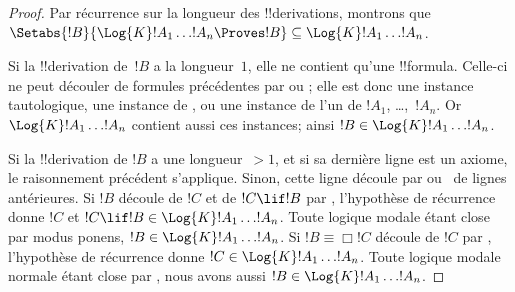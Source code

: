 \documentclass[../../../include/open-logic-section]{subfiles}
\begin{document}
\begin{proof}
  Par récurrence sur la longueur des !!{derivation}s, montrons que
  $\Setabs{!B}{\Log{K} !A_1 \dots !A_n \Proves !B} \subseteq
  \Log{K} !A_1 \dots !A_n$.

  Si la !!{derivation} de~$!B$ a la longueur~$1$, elle ne contient
  qu'une !!{formula}. Celle-ci ne peut découler de formules
  précédentes par \MP{} ou \Nec; elle est donc une instance
  tautologique, une instance de ,
  ou une instance de l'un de $!A_1$, \dots,~$!A_n$. Or
  $\Log{K}!A_1\dots!A_n$ contient aussi ces instances; ainsi
  $!B \in \Log{K}!A_1 \dots !A_n$.

  Si la !!{derivation} de $!B$ a une longueur~$> 1$, et si sa
  dernière ligne est un axiome, le raisonnement précédent s'applique.
  Sinon, cette ligne découle par \MP{} ou~\Nec{} de lignes
  antérieures. Si $!B$ découle de $!C$ et de
  $!C \lif !B$ par \MP, l'hypothèse de récurrence donne
  $!C$ et $!C \lif !B \in \Log{K}!A_1 \dots !A_n$. Toute logique
  modale étant close par modus ponens,
  $!B \in \Log{K}!A_1 \dots !A_n$. Si $!B \equiv \Box !C$ découle de
  $!C$ par \Nec, l'hypothèse de récurrence donne
  $!C \in \Log{K}!A_1 \dots !A_n$. Toute logique modale normale
  étant close par \Nec, nous avons aussi
  $!B \in \Log{K}!A_1\dots!A_n$.


\end{proof}
\end{document}
